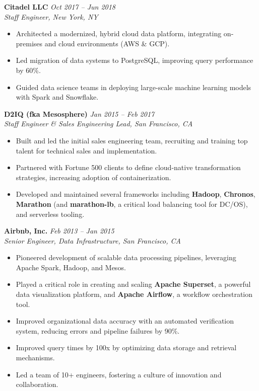 \documentclass[margin,line]{resume}
\begin{document}
\begin{resume}
\textbf{Citadel LLC} \hfill \textit{Oct 2017 -- Jun 2018} \\
\textit{Staff Engineer, New York, NY}
\begin{itemize}[leftmargin=0.5cm]
    \item Architected a modernized, hybrid cloud data platform, integrating on-premises and cloud environments (AWS \& GCP).
    \item Led migration of data systems to PostgreSQL, improving query performance by 60\%.
    \item Guided data science teams in deploying large-scale machine learning models with Spark and Snowflake.
\end{itemize}

\textbf{D2IQ (fka Mesosphere)} \hfill \textit{Jan 2015 -- Feb 2017} \\
\textit{Staff Engineer \& Sales Engineering Lead, San Francisco, CA}
\begin{itemize}[leftmargin=0.5cm]
    \item Built and led the initial sales engineering team, recruiting and training top talent for technical sales and implementation.
    \item Partnered with Fortune 500 clients to define cloud-native transformation strategies, increasing adoption of containerization.
    \item Developed and maintained several frameworks including \textbf{Hadoop}, \textbf{Chronos}, \textbf{Marathon} (and \textbf{marathon-lb}, a critical load balancing tool for DC/OS), and serverless tooling.
\end{itemize}

\textbf{Airbnb, Inc.} \hfill \textit{Feb 2013 -- Jan 2015} \\
\textit{Senior Engineer, Data Infrastructure, San Francisco, CA}
\begin{itemize}[leftmargin=0.5cm]
    \item Pioneered development of scalable data processing pipelines, leveraging Apache Spark, Hadoop, and Mesos.
    \item Played a critical role in creating and scaling \textbf{Apache Superset}, a powerful data visualization platform, and \textbf{Apache Airflow}, a workflow orchestration tool.
    \item Improved organizational data accuracy with an automated verification system, reducing errors and pipeline failures by 90\%.
    \item Improved query times by 100x by optimizing data storage and retrieval mechanisms.
    \item Led a team of 10+ engineers, fostering a culture of innovation and collaboration.
\end{itemize}


\end{resume}
\end{document}
